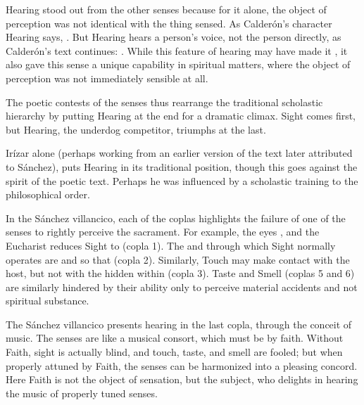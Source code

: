 Hearing stood out from the other senses because for it alone, the object of
perception was not identical with the thing sensed.
As Calderón's character Hearing says, .%
    \Autocite[]{Calderon:Retiro}
But Hearing hears a person's voice, not the person directly, as Calderón's text
continues: .%
    \Autocite[]{Calderon:Retiro}
While this feature of hearing may have made it , it also
gave this sense a unique capability in spiritual matters, where the object of
perception was not immediately sensible at all.

The poetic contests of the senses thus rearrange the traditional scholastic
hierarchy by putting Hearing at the end for a dramatic climax.
Sight comes first, but Hearing, the underdog competitor, triumphs at the
last.
\begin{Footnote}
    Irízar alone (perhaps working from an earlier version of the text later
    attributed to Sánchez), puts Hearing in its traditional position, though
    this goes against the spirit of the poetic text.  
    Perhaps he was influenced by a scholastic training to  the
    philosophical order.
\end{Footnote}
In the Sánchez villancico, each of the coplas highlights the failure of one of
the senses to rightly perceive the sacrament.
For example, the eyes , and the Eucharist
reduces Sight to  (copla 1).
The  and  through which Sight normally
operates are   and
 so that  (copla 2).
Similarly, Touch may make contact with the host, but not with the
 hidden within (copla 3).
Taste and Smell (coplas 5 and 6) are similarly hindered by their ability only to
perceive material accidents and not spiritual substance.

The Sánchez villancico presents hearing in the last copla, through the conceit
of music.
The senses are  like a musical consort, which must be
 by faith.
Without Faith, sight is actually blind, and touch, taste, and smell are fooled;
but when properly attuned by Faith, the senses can be harmonized into a pleasing
concord.
Here Faith is not the object of sensation, but the subject, who delights in
hearing the music of properly tuned senses.

